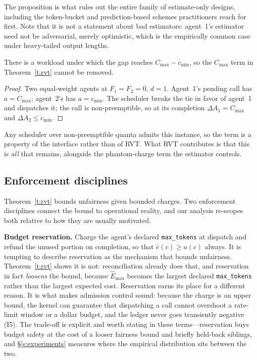 \documentclass[letterpaper,11pt,leqno]{article}
\begin{document}
The proposition is what rules out the entire family of estimate-only designs, including the token-bucket and prediction-based schemes practitioners reach for first. Note that it is not a statement about bad estimators: agent~1's estimator need not be adversarial, merely optimistic, which is the empirically common case under heavy-tailed output lengths.

\begin{proposition}\label{p:tightness}
There is a workload under which the gap reaches $C_{\max} - c_{\min}$, so the $C_{\max}$ term in Theorem~\ref{t:rvt} cannot be removed.
\end{proposition}

\begin{proof}
Two equal-weight agents at $F_1 = F_2 = 0$, $d = 1$. Agent~1's pending call has $a = C_{\max}$; agent~2's has $a = c_{\min}$. The scheduler breaks the tie in favor of agent~1 and dispatches it; the call is non-preemptible, so at its completion $\Delta A_1 = C_{\max}$ and $\Delta A_2 \le c_{\min}$.
\end{proof}

Any scheduler over non-preemptible quanta admits this instance, so the term is a property of the interface rather than of RVT. What RVT contributes is that this is \emph{all} that remains, alongside the phantom-charge term the estimator controls.

\subsection{Enforcement disciplines}\label{s:enforcement}

Theorem~\ref{t:rvt} bounds unfairness given bounded charges. Two enforcement disciplines connect the bound to operational reality, and our analysis re-scopes both relative to how they are usually motivated.

\textbf{Budget reservation.} Charge the agent's declared \texttt{max\_tokens} at dispatch and refund the unused portion on completion, so that $\hat{e}(c) \ge a(c)$ always. It is tempting to describe reservation as the mechanism that bounds unfairness. Theorem~\ref{t:rvt} shows it is not: reconciliation already does that, and reservation in fact \emph{loosens} the bound, because $\hat{E}_{\max}$ becomes the largest declared \texttt{max\_tokens} rather than the largest expected cost. Reservation earns its place for a different reason. It is what makes admission control sound: because the charge is an upper bound, the kernel can guarantee that dispatching a call cannot overshoot a rate-limit window or a dollar budget, and the ledger never goes transiently negative (I5). The trade-off is explicit and worth stating in these terms---reservation buys budget safety at the cost of a looser fairness bound and briefly held-back siblings, and \S\ref{s:experiments} measures where the empirical distribution sits between the two.
\end{document}
